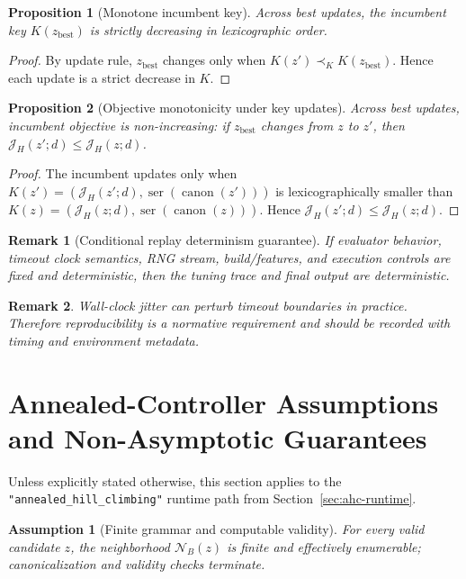 \documentclass[11pt]{article}
\newtheorem{proposition}{Proposition}
\newtheorem{remark}{Remark}
\newtheorem{assumption}{Assumption}
\begin{document}
\begin{proposition}[Monotone incumbent key]
Across best updates, the incumbent key $K(z_{\mathrm{best}})$ is strictly decreasing in lexicographic order.
\end{proposition}

\begin{proof}
By update rule, $z_{\mathrm{best}}$ changes only when $K(z')\prec_K K(z_{\mathrm{best}})$. Hence each update is a strict decrease in $K$.
\end{proof}

\begin{proposition}[Objective monotonicity under key updates]
Across best updates, incumbent objective is non-increasing: if
$z_{\mathrm{best}}$ changes from $z$ to $z'$, then
$\mathcal{J}_H(z';d)\le\mathcal{J}_H(z;d)$.
\end{proposition}

\begin{proof}
The incumbent updates only when
$K(z')=(\mathcal{J}_H(z';d),\operatorname{ser}(\operatorname{canon}(z')))$ is
lexicographically smaller than
$K(z)=(\mathcal{J}_H(z;d),\operatorname{ser}(\operatorname{canon}(z)))$.
Hence $\mathcal{J}_H(z';d)\le\mathcal{J}_H(z;d)$.
\end{proof}

\begin{remark}[Conditional replay determinism guarantee]
If evaluator behavior, timeout clock semantics, RNG stream, build/features, and
execution controls are fixed and deterministic, then the tuning trace and final
output are deterministic.
\end{remark}

\begin{remark}
Wall-clock jitter can perturb timeout boundaries in practice. Therefore reproducibility is a normative requirement and should be recorded with timing and environment metadata.
\end{remark}

\section{Annealed-Controller Assumptions and Non-Asymptotic Guarantees}\label{sec:annealed-guarantees}

Unless explicitly stated otherwise, this section applies to the
\texttt{"annealed\_hill\_climbing"} runtime path from
Section~\ref{sec:ahc-runtime}.

\begin{assumption}[Finite grammar and computable validity]\label{ass:finite-grammar-validity}
For every valid candidate $z$, the neighborhood $\mathcal{N}_B(z)$ is finite and effectively enumerable; canonicalization and validity checks terminate.
\end{assumption}
\end{document}
